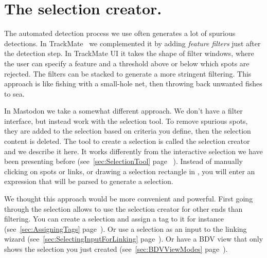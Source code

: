 \section{The selection creator.}
\label{sec:SelectionCreator}

The automated detection process we use often generates a lot of spurious detections.
In TrackMate~\cite{TrackMate} we complemented it by adding \textit{feature filters} just after the detection step.
In TrackMate UI it takes the shape of filter windows, where the user can specify a feature and a threshold above or below which spots are rejected. 
The filters can be stacked to generate a more stringent filtering.
This approach is like fishing with a small-hole net, then throwing back unwanted fishes to sea.

In Mastodon we take a somewhat different approach.
We don't have a filter interface, but instead work with the selection tool.
To remove spurious spots, they are added to the selection based on criteria you define, then the selection content is deleted.
The tool to create a selection is called the selection creator and we describe it here. 
It works differently from the interactive selection we have been presenting before (see~\ref{sec:SelectionTool} page~\pageref{sec:SelectionTool} ).
Instead of manually clicking on spots or links, or drawing a selection rectangle in \TrackScheme, you will enter an expression that will be parsed to generate a selection.

We thought this approach would be more convenient and powerful.
First going through the selection allows to use the selection creator for other ends than filtering.
You can create a selection and assign a tag to it for instance (see~\ref{sec:AssigningTags} page~\pageref{sec:AssigningTags}).
Or use a selection as an input to the linking wizard (see~\ref{sec:SelectingInputForLinking} page~\pageref{sec:SelectingInputForLinking}).
Or have a BDV view that only shows the selection you just created (see~\ref{sec:BDVViewModes} page~\pageref{sec:BDVViewModes}).

